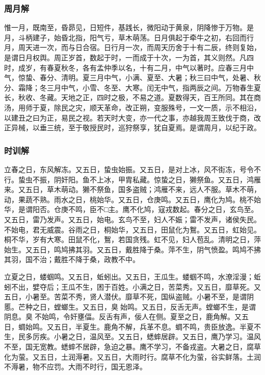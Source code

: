 \documentclass[]{article}
\begin{document}
\hypertarget{header-n275}{%
\subsubsection{周月解}\label{header-n275}}

惟一月，既南至，昏昴见，日短件，基践长，微阳动于黄泉，阴降惨于万物。是月，斗柄建子，始昏北指，阳气亏，草木萌荡。日月俱起于牵牛之初，右回而行月，周天进一次，而与日合宿。日行月一次，而周天历舍于十有二辰，终则复始，是谓日月权舆。周正岁首，数起于时，一而成于十次，一为首，其义则然。凡四时，成岁，有春夏秋冬，各有孟仲季以名，十有二月，中气以著时。应春三月中气，惊蛰、春分、清明。夏三月中气，小满、夏至、大暑；秋三曰中气，处暑、秋分、霜降；冬三月中气，小雪、冬至、大寒。闰无中气，指两辰之间。万物春生夏长，秋收、冬藏。天地之正，四时之极，不易之道。夏数得天，百王所同。其在商汤，用师于夏，除民之灾，顺天革命，改正朔，变服殊号，一文一质，示不相沿，以建丑之曰为正，易民之视。若天时大变，亦一代之事，亦越我周王致伐于商，改正异械，以垂三统，至于敬授民时，巡狩祭享，犹自夏焉。是谓周月，以纪于政。

\hypertarget{header-n279}{%
\subsubsection{时训解}\label{header-n279}}

立春之日，东风解冻。又五日，蛰虫始振。又五日，是对上冰，风不街冻，号令不行。蛰虫不振，阴奸阳。鱼不上冰，甲胄私藏。惊蛰之日，獭祭鱼。又五日，鸿雁来。又五日，草木萌动。獭不祭鱼，国多盗贼；鸿雁不来，远人不服。草木不萌，动，果蔬不熟。雨水之日，桃始华。又五日，仓庚鸣。又五日，鹰化为鸠。桃不始华，是谓阳否。仓庚不鸣，臣不□主。鹰不化鸠，寇戎数起。春分之日，玄鸟至。又五日，雷乃发声。又五日，始电。玄鸟不至，妇人不娠；雷不发声，诸侯失民。不始电，君无威震。谷雨之日，桐始华，又五日，田鼠化为鴽。又五日，虹始见。桐不华，岁有大寒。田鼠不化，鴽，若国贪残。虹不见，妇人苞乱。清明之日，萍始生。又五日，鸣鸠拂其羽。又五日，戴胜降于桑。萍不生，阴气愤盈。鸣鸠不拂其羽，国不治；戴胜不降于桑，政教不中。

立夏之日，蝼蝈鸣。又五日，蚯蚓出。又五日，王瓜生。蝼蝈不鸣，水潦淫漫；蚯蚓不出，嬖夺后；王瓜不生，困于百姓。小满之日，苦菜秀。又五日，靡草死。又五日，小暑至。苦菜不秀，贤人潜伏。靡草不死，国纵盗贼。小暑不至，是谓阴慝。芒种之日，螳螂生。又五日，臭始鸣。又五日，反舌无声。螳螂不生，是谓阴息。臭不始鸣，令奸壅偪。反舌有声，佞人在侧。夏至之日，鹿角解。又五日，蜩始鸣。又五日，半夏生。鹿角不解，兵革不息。蜩不鸣，贵臣放逸。半夏不生，民多厉疾。小暑之日，温风至。又五日，蟋蟀居辟。又五日，鹰乃学习。温风不至，国无宽教。蟋蟀不居辟，急迫之暴。鹰不学习，不备戎盗。大暑之日，腐草化为萤。又五日，土润溽暑。又五日，大雨时行。腐草不化为萤，谷实鲜落。土润不溽暑，物不应罚。大雨不时行，国无恩泽。
\end{document}
